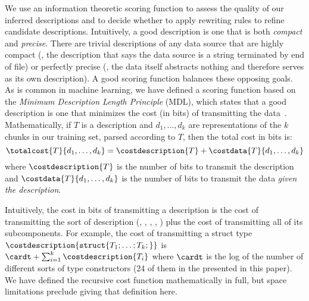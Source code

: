 We use an information theoretic scoring function to assess the quality of 
our inferred descriptions and to decide whether to apply
rewriting rules to refine candidate descriptions.
Intuitively, a good description is one that is both {\em compact} and
{\em precise}.  There are trivial descriptions of any data source
that are highly compact (\eg{}, the description that says
the data source is a string terminated by end of file) or
perfectly precise (\eg{}, the data itself abstracts nothing and
therefore serves as its own description).  A good scoring function
balances these opposing goals.  As is common
in machine learning, we have defined a scoring function based on the
{\em Minimum Description Length Principle} (MDL), which states that
a good description is one that minimizes the cost (in bits) of transmitting
the data~\cite{mdlbook}.  Mathematically,
if $T$ is a description and $d_1,\ldots,d_k$ are representations of
the $k$ chunks in our training set, parsed according to $T$, then the 
total cost in bits is:
\[
\totalcost{T}{d_1,\ldots,d_k} = \costdescription{T} + \costdata{T}{d_1,\ldots,d_k}
\]
where $\costdescription{T}$ is the number of bits to transmit the
description and $\costdata{T}{d_1,\ldots,d_k}$ is the number of bits
to transmit the data {\em given the description}.

Intuitively, the cost in bits of transmitting a description
is the cost of transmitting the sort of description (\ie{}, ,
, , \etc{}) plus the cost of transmitting all of its
subcomponents.  
For example, the cost of transmitting a struct type
$\costdescription{\mathtt{struct \{} T_1;\ldots ;T_k; \mathtt{\}}}$ is 
$\cardt + \sum_{i=1}^{k} \costdescription{T_i}$
where $\cardt$ is the log of the number of different sorts of type 
constructors (24 of them in the \ir{} presented in this paper).
We have defined the recursive cost function mathematically in full,
but space limitations preclude giving that definition here.

